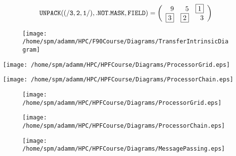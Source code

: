 \documentclass{article}
\begin{document}
{\newpage
\clearpage
\samepage \begin{equation}{\tt UNPACK((/3,2,1/),.NOT.MASK,FIELD)} = 
\left(
\begin{array}{rrr}
9 &  5 &  \fbox{1}\\  
\fbox{3} &  \fbox{2} &  3
\end{array}
\right)
\end{equation}
}

{\newpage
\clearpage
\samepage {}
}

{\newpage
\clearpage
\samepage \begin{figure}[H]
\begin{center}
\texttt{[image: /home/spm/adamm/HPC/F90Course/Diagrams/TransferIntrinsicDiagram]}

\end{center}
\end{figure}
}

{\newpage
\clearpage
\samepage \texttt{[image: /home/spm/adamm/HPC/HPFCourse/Diagrams/ProcessorGrid.eps]}
}

{\newpage
\clearpage
\samepage \texttt{[image: /home/spm/adamm/HPC/HPFCourse/Diagrams/ProcessorChain.eps]}
}

{\newpage
\clearpage
\samepage \begin{figure}[H]
\hspace*{3.5cm}
\texttt{[image: /home/spm/adamm/HPC/HPFCourse/Diagrams/ProcessorGrid.eps]}

\label{2DProcessorGrid:fig}
\end{figure}
}

{\newpage
\clearpage
\samepage \begin{figure}[H]
\hspace*{3.0cm}
\texttt{[image: /home/spm/adamm/HPC/HPFCourse/Diagrams/ProcessorChain.eps]}

\label{1DProcessorChain:fig}
\end{figure}
}

{\newpage
\clearpage
\samepage {}
}

{\newpage
\clearpage
\samepage \begin{figure}[H]
\hspace*{3.0cm}\texttt{[image: /home/spm/adamm/HPC/HPFCourse/Diagrams/MessagePassing.eps]}

\label{MessagePassing:fig}
\end{figure}
}
\end{document}
